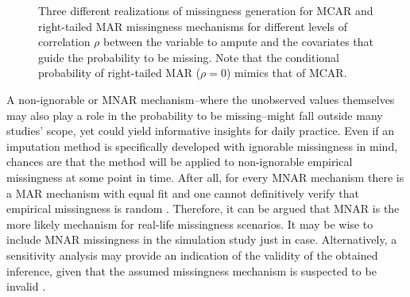 \documentclass[bimj,fleqn]{w-art}
\begin{document}
\begin{figure}[t!]
  \caption{Three different realizations of missingness generation for MCAR and right-tailed MAR missingness mechanisms for different levels of correlation $\rho$ between the variable to ampute and the covariates that guide the probability to be missing. Note that the conditional probability of right-tailed MAR ($\rho=0$) mimics that of MCAR.}
    \label{Fig4}
\end{figure}

A non-ignorable or MNAR mechanism--where the unobserved values themselves may also play a role in the probability to be missing--might fall outside many studies' scope, yet could yield informative insights for daily practice. Even if an imputation method is specifically developed with ignorable missingness in mind, chances are that the method will be applied to non-ignorable empirical missingness at some point in time. After all, for every MNAR mechanism there is a MAR mechanism with equal fit and one cannot definitively verify that empirical missingness is random \citep{molenberghs2008every}. Therefore, it can be argued that MNAR is the more likely mechanism for real-life missingness scenarios. It may be wise to include MNAR missingness in the simulation study just in case. Alternatively, a sensitivity analysis may provide an indication of the validity of the obtained inference, given that the assumed missingness mechanism is suspected to be invalid \citep[see e.g.][part 5]{molenberghs2014handbook}.
\end{document}
